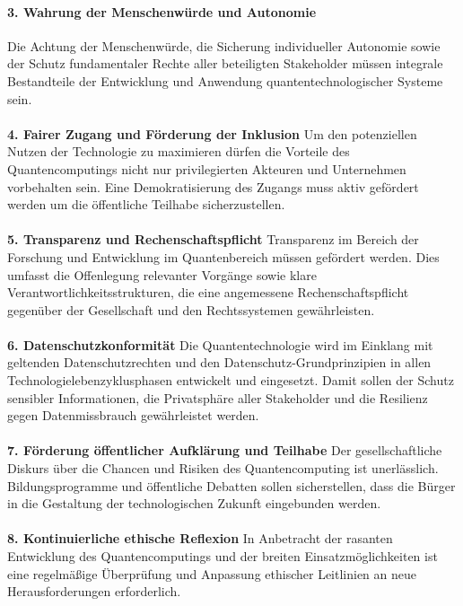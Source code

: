 \paragraph{\textbf{3. Wahrung der Menschenwürde und Autonomie}}
Die Achtung der Menschenwürde, die Sicherung individueller Autonomie sowie der Schutz fundamentaler Rechte aller beteiligten Stakeholder müssen integrale Bestandteile der Entwicklung und Anwendung quantentechnologischer Systeme sein.
\\
\\
\textbf{4. Fairer Zugang und Förderung der Inklusion}
Um den potenziellen Nutzen der Technologie zu maximieren dürfen die Vorteile des Quantencomputings nicht nur privilegierten Akteuren und Unternehmen vorbehalten sein. Eine Demokratisierung des Zugangs muss aktiv gefördert werden um die öffentliche Teilhabe sicherzustellen.
\\
\\
\textbf{5. Transparenz und Rechenschaftspflicht}
Transparenz im Bereich der Forschung und Entwicklung im Quantenbereich müssen gefördert werden. Dies umfasst die Offenlegung relevanter Vorgänge sowie klare Verantwortlichkeitsstrukturen, die eine angemessene Rechenschaftspflicht gegenüber der Gesellschaft und den Rechtssystemen gewährleisten.
\\
\\
\textbf{6. Datenschutzkonformität}
Die Quantentechnologie wird im Einklang mit geltenden Datenschutzrechten und den Datenschutz-Grundprinzipien in allen Technologielebenzyklusphasen entwickelt und eingesetzt. Damit sollen der Schutz sensibler Informationen, die Privatsphäre aller Stakeholder und die Resilienz gegen Datenmissbrauch gewährleistet werden.
\\
\\
\textbf{7. Förderung öffentlicher Aufklärung und Teilhabe}
Der gesellschaftliche Diskurs über die Chancen und Risiken des Quantencomputing ist unerlässlich. Bildungsprogramme und öffentliche Debatten sollen sicherstellen, dass die Bürger in die Gestaltung der technologischen Zukunft eingebunden werden.
\\
\\
\textbf{8. Kontinuierliche ethische Reflexion}
In Anbetracht der rasanten Entwicklung des Quantencomputings und der breiten Einsatzmöglichkeiten ist eine regelmäßige Überprüfung und Anpassung ethischer Leitlinien an neue Herausforderungen erforderlich.
\\
\\

